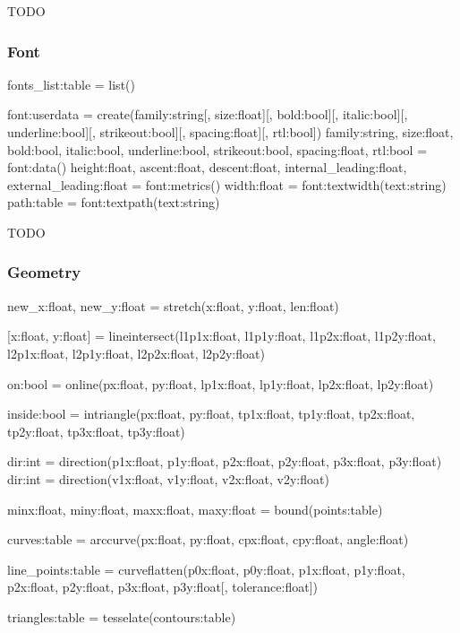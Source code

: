 TODO

\subsubsection{Font}
\label{sec:font}

fonts_list:table = list()

font:userdata = create(family:string[, size:float][, bold:bool][, italic:bool][, underline:bool][, strikeout:bool][, spacing:float][, rtl:bool])
family:string, size:float, bold:bool, italic:bool, underline:bool, strikeout:bool, spacing:float, rtl:bool = font:data()
height:float, ascent:float, descent:float, internal_leading:float, external_leading:float = font:metrics()
width:float = font:textwidth(text:string)
path:table = font:textpath(text:string)

TODO

\subsubsection{Geometry}
\label{sec:geometry}

new_x:float, new_y:float = stretch(x:float, y:float, len:float)

[x:float, y:float] = lineintersect(l1p1x:float, l1p1y:float, l1p2x:float, l1p2y:float, l2p1x:float, l2p1y:float, l2p2x:float, l2p2y:float)

on:bool = online(px:float, py:float, lp1x:float, lp1y:float, lp2x:float, lp2y:float)

inside:bool = intriangle(px:float, py:float, tp1x:float, tp1y:float, tp2x:float, tp2y:float, tp3x:float, tp3y:float)

dir:int = direction(p1x:float, p1y:float, p2x:float, p2y:float, p3x:float, p3y:float)
dir:int = direction(v1x:float, v1y:float, v2x:float, v2y:float)

minx:float, miny:float, maxx:float, maxy:float = bound(points:table)

curves:table = arccurve(px:float, py:float, cpx:float, cpy:float, angle:float)

line_points:table = curveflatten(p0x:float, p0y:float, p1x:float, p1y:float, p2x:float, p2y:float, p3x:float, p3y:float[, tolerance:float])

triangles:table = tesselate(contours:table)

